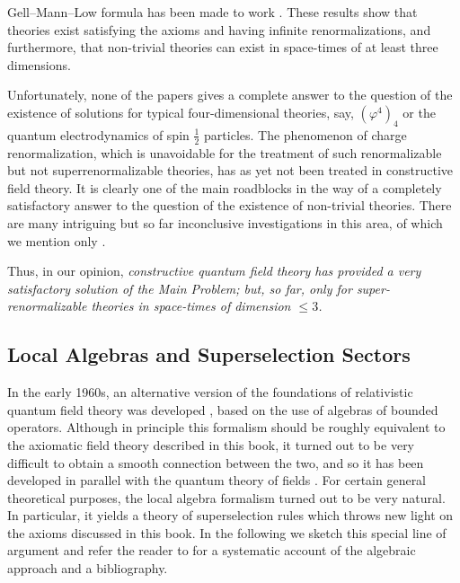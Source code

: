 Gell--Mann--Low formula has been made to work \cite{pct-app-61,pct-app-62,pct-app-60}.  These
results show that theories exist satisfying the axioms and having infinite
renormalizations, and furthermore, that non-trivial theories can exist in
space-times of at least three dimensions.

Unfortunately, none of the papers gives a complete answer to the question of
the existence of solutions for typical four-dimensional theories, say,
$(\varphi^4)_4$ or the quantum electrodynamics of spin $\tfrac12$ particles.
The phenomenon of charge renormalization, which is unavoidable for the
treatment of such renormalizable but not superrenormalizable theories, has as
yet not been treated in constructive field theory.  It is clearly one of the
main roadblocks in the way of a completely satisfactory answer to the
question of the existence of non-trivial theories.  There are many
intriguing but so far inconclusive investigations in this area, of which we
mention only \cite{pct-app-63,pct-app-64}.

Thus, in our opinion, \emph{constructive quantum field theory has provided a
very satisfactory solution of the Main Problem; but, so far, only for
super-renormalizable theories in space-times of dimension $\leq 3$.}

\subsection*{Local Algebras and Superselection Sectors}
{}
\label{sec:appendix-local-algebras}

In the early 1960s, an alternative version of the foundations of
relativistic quantum field theory was developed \cite{pct-app-65}, based on the use of
algebras of bounded operators.  Although in principle this formalism should
be roughly equivalent to the axiomatic field theory described in this book,
it turned out to be very difficult to obtain a smooth connection between the
two, and so it has been developed in parallel with the quantum theory of
fields \cite{pct-app-66}.  For certain general theoretical purposes, the local algebra
formalism turned out to be very natural.  In particular, it yields a theory
of superselection rules which throws new light on the axioms discussed in
this book.  In the following we sketch this special line of argument and
refer the reader to \cite{pct-app-67} for a systematic account of the algebraic approach
and a bibliography.


